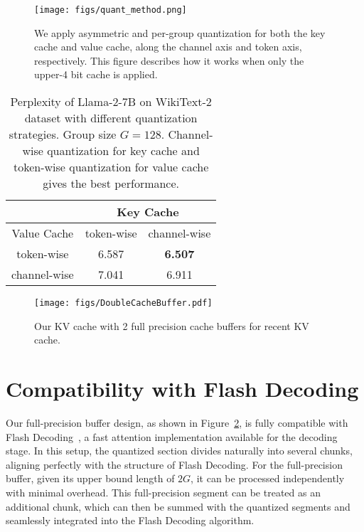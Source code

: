 \begin{figure}[h!]
    \centering
    \texttt{[image: figs/quant\_method.png]}
    \caption{We apply asymmetric and per-group quantization for both the key cache and value cache, along the channel axis and token axis, respectively. This figure describes how it works when only the upper-4 bit cache is applied.}\label{fig:group_quant_asymmetric_quant}
\end{figure}

\begin{table}[h]
    \centering
    \begin{tabular}{c|cc}
        \toprule
         & \multicolumn{2}{c}{Key Cache} \\
        \midrule
        Value Cache & token-wise & channel-wise \\
        \midrule
        token-wise & 6.587 & \textbf{6.507} \\
        channel-wise & 7.041 & 6.911 \\
        \bottomrule
    \end{tabular}
    \caption{Perplexity of Llama-2-7B on WikiText-2 dataset with different quantization strategies. Group size $G = 128$. Channel-wise quantization for key cache and token-wise quantization for value cache gives the best performance.}\label{tab:token_channel_wise_quant}
\end{table}

\label{appendix:fp_cache_buffer}
\begin{figure}[h]
    \centering
    \texttt{[image: figs/DoubleCacheBuffer.pdf]}
    \caption{Our KV cache with 2 full precision cache buffers for recent KV cache.}
    \label{fig:double_size_fp_buffer}
\end{figure}

\section{Compatibility with Flash Decoding}\label{appendix:flash_decoding}
Our full-precision buffer design, as shown in Figure~\ref{fig:double_size_fp_buffer}, is fully compatible with Flash Decoding~\cite{flashdecoding}, a fast attention implementation available for the decoding stage. In this setup, the quantized section divides naturally into several chunks, aligning perfectly with the structure of Flash Decoding. For the full-precision buffer, given its upper bound length of $2G$, it can be processed independently with minimal overhead. This full-precision segment can be treated as an additional chunk, which can then be summed with the quantized segments and seamlessly integrated into the Flash Decoding algorithm.



